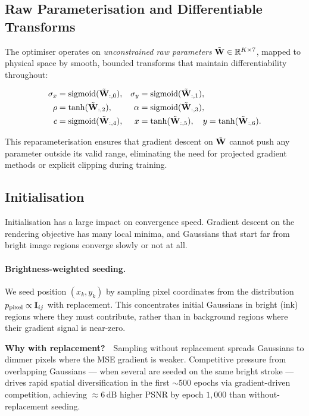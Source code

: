 \subsection{Raw Parameterisation and Differentiable Transforms}

The optimiser operates on \emph{unconstrained raw parameters}
$\tilde{\mathbf{W}} \in \mathbb{R}^{K \times 7}$, mapped to physical space by smooth, bounded
transforms that maintain differentiability throughout:

\begin{align}
  \sigma_x &= \operatorname{sigmoid}(\tilde{\mathbf{W}}_{:,0}), &
  \sigma_y &= \operatorname{sigmoid}(\tilde{\mathbf{W}}_{:,1}), \label{eq:sigma}\\
  \rho     &= \tanh(\tilde{\mathbf{W}}_{:,2}),    &
  \alpha   &= \operatorname{sigmoid}(\tilde{\mathbf{W}}_{:,3}), \label{eq:rho}\\
  c        &= \operatorname{sigmoid}(\tilde{\mathbf{W}}_{:,4}), &
  x        &= \tanh(\tilde{\mathbf{W}}_{:,5}),\quad
  y = \tanh(\tilde{\mathbf{W}}_{:,6}).              \label{eq:xy}
\end{align}

\noindent This reparameterisation ensures that gradient descent on $\tilde{\mathbf{W}}$
cannot push any parameter outside its valid range, eliminating the need for
projected gradient methods or explicit clipping during training.

\subsection{Initialisation}
\label{sec:init}

Initialisation has a large impact on convergence speed.
Gradient descent on the rendering objective has many local minima, and
Gaussians that start far from bright image regions converge slowly or not at all.

\paragraph{Brightness-weighted seeding.}
We seed position $(x_k, y_k)$ by sampling pixel coordinates from the
distribution $p_\text{pixel} \propto \mathbf{I}_{ij}$ with replacement.
This concentrates initial Gaussians in bright (ink) regions where they must
contribute, rather than in background regions where their gradient signal is
near-zero.

\medskip\noindent
\textbf{Why with replacement?}\ \ Sampling without replacement spreads Gaussians
to dimmer pixels where the MSE gradient is weaker.
Competitive pressure from overlapping Gaussians — when several are seeded on
the same bright stroke — drives rapid spatial diversification in the first
${\sim}500$ epochs via gradient-driven competition, achieving ${\approx}6\,\text{dB}$
higher PSNR by epoch $1{,}000$ than without-replacement seeding.

